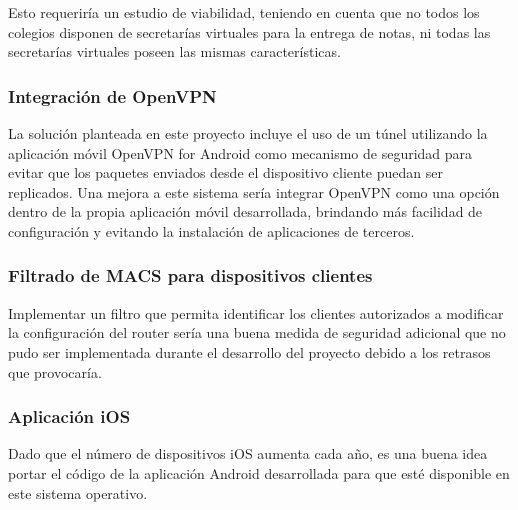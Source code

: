 \documentclass[12pt, twoside]{article}
\begin{document}
        Esto requeriría un estudio de viabilidad, teniendo en cuenta que no todos los colegios disponen de secretarías virtuales para la entrega de notas, ni todas las secretarías virtuales poseen las mismas características.

        \subsubsection{Integración de OpenVPN}
        La solución planteada en este proyecto incluye el uso de un túnel utilizando la aplicación móvil OpenVPN for Android como mecanismo de seguridad para evitar que los paquetes enviados desde el dispositivo cliente puedan ser replicados. Una mejora a este sistema sería integrar OpenVPN como una opción dentro de la propia aplicación móvil desarrollada, brindando más facilidad de configuración y evitando la instalación de aplicaciones de terceros.

        \subsubsection{Filtrado de MACS para dispositivos clientes}
        Implementar un filtro que permita identificar los clientes autorizados a modificar la configuración del router sería una buena medida de seguridad adicional que no pudo ser implementada durante el desarrollo del proyecto debido a los retrasos que provocaría.

        \subsubsection{Aplicación iOS}
        Dado que el número de dispositivos iOS aumenta cada año, es una buena idea portar el código de la aplicación Android desarrollada para que esté disponible en este sistema operativo.










\end{document}
